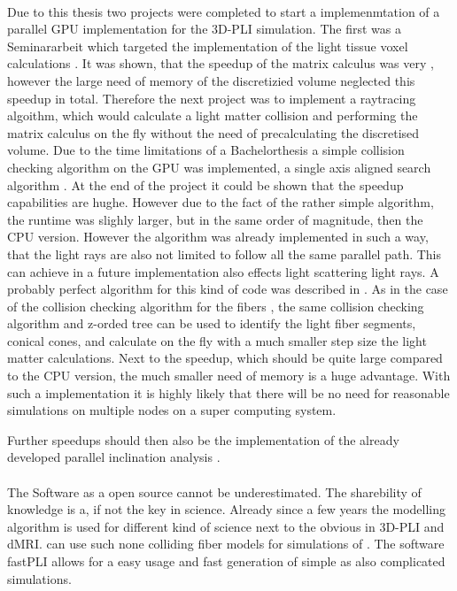 \paragraph{}
\dummy{}
\par
Due to this thesis two projects were completed to start a implemenmtation of a parallel \ac{GPU} implementation for the \ac{3D-PLI} simulation.
The first was a Seminararbeit \cite{Kobusch:Seminar} which targeted the implementation of the light tissue voxel calculations \dummy{}.
It was shown, that the speedup of the matrix calculus was very \dummy{}, however the large need of memory of the discretizied volume neglected this speedup in total.
Therefore the next project \cite{Kobusch:887783} was to implement a raytracing algoithm, which would calculate a light matter collision and performing the matrix calculus on the fly without the need of precalculating the discretised volume.
Due to the time limitations of a Bachelorthesis a simple collision checking algorithm on the \ac{GPU} was implemented, a single axis aligned search algorithm \cite{Karras2012}.
At the end of the project it could be shown that the speedup capabilities are hughe.
However due to the fact of the rather simple algorithm, the runtime was slighly larger, but in the same order of magnitude, then the \ac{CPU} version.
However the algorithm was already implemented in such a way, that the light rays are also not limited to follow all the same parallel path.
This can achieve in a future implementation also effects light scattering light rays.
A probably perfect algorithm for this kind of code was described in \cite{Karras2012}.
As in the case of the collision checking algorithm for the fibers \dummy{}, the same collision checking algorithm and z-orded tree can be used to identify the light fiber segments, \ie{} conical cones, and calculate on the fly with a much smaller step size the light matter calculations.
Next to the speedup, which should be quite large compared to the \ac{CPU} version, the much smaller need of memory is a huge advantage.
With such a implementation it is highly likely that there will be no need for reasonable simulations on multiple nodes on a super computing system.
\par
% 
Further speedups should then also be the implementation of the already developed parallel inclination analysis \dummy{}.
%
% 
% 
\paragraph{}
% 
The Software as a open source cannot be underestimated.
The sharebility of knowledge is a, if not the key in science.
Already since a few years the modelling algorithm is used for different kind of science next to the obvious in \ac{3D-PLI} and \ac{dMRI}.
\cite{Ji2021} can use such none colliding fiber models for simulations of \dummy{}.
The software \ac{fastPLI} allows for a easy usage and fast generation of simple as also complicated simulations.
% 
% 
% 
